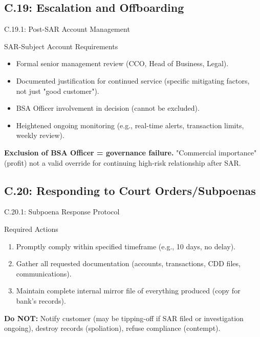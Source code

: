 \documentclass{beamer}
\begin{document}
	\subsection{C.19: Escalation and Offboarding}
	
	\begin{frame}{C.19.1: Post-SAR Account Management}
		\begin{block}{SAR-Subject Account Requirements}
			\begin{itemize}
				\item Formal senior management review (CCO, Head of Business, Legal).
				\item Documented justification for continued service (specific mitigating factors, not just "good customer").
				\item BSA Officer involvement in decision (cannot be excluded).
				\item Heightened ongoing monitoring (e.g., real-time alerts, transaction limits, weekly review).
			\end{itemize}
		\end{block}
		\textbf{ Exclusion of BSA Officer = governance failure.} "Commercial importance" (profit) not a valid override for continuing high-risk relationship after SAR.
	\end{frame}
	
	\subsection{C.20: Responding to Court Orders/Subpoenas}
	
	\begin{frame}{C.20.1: Subpoena Response Protocol}
		\begin{block}{Required Actions}
			\begin{enumerate}
				\item Promptly comply within specified timeframe (e.g., 10 days, no delay).
				\item Gather all requested documentation (accounts, transactions, CDD files, communications).
				\item Maintain complete internal mirror file of everything produced (copy for bank's records).
			\end{enumerate}
		\end{block}
		\textbf{Do NOT:} Notify customer (may be tipping-off if SAR filed or investigation ongoing), destroy records (spoliation), refuse compliance (contempt).
	\end{frame}
	
\end{document}
